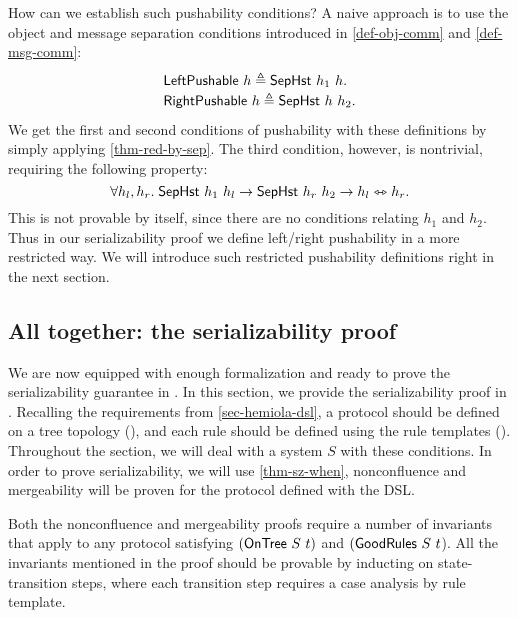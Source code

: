 How can we establish such pushability conditions?
A naive approach is to use the object and message separation conditions introduced in \autoref{def-obj-comm} and \autoref{def-msg-comm}:
\begin{displaymath}
  \renewcommand{\arraystretch}{1.2}
  \begin{array}{l}
    \mathsf{LeftPushable}\ h \triangleq \stseph{h_1}{h}.\\
    \mathsf{RightPushable}\ h \triangleq \stseph{h}{h_2}.
  \end{array}
\end{displaymath}
We get the first and second conditions of pushability with these definitions by simply applying \autoref{thm-red-by-sep}.
The third condition, however, is nontrivial, requiring the following property:
\begin{displaymath}
  \forall h_l, h_r.\; \mathsf{SepHst}\ h_1\ h_l \to \mathsf{SepHst}\ h_r\ h_2 \to h_l \leftrightarrowtriangle h_r.
\end{displaymath}
This is not provable by itself, since there are no conditions relating $h_1$ and $h_2$.
Thus in our serializability proof we define left/right pushability in a more restricted way.
We will introduce such restricted pushability definitions right in the next section.

\subsection{All together: the serializability proof}
\label{sec-sz-proof-all}

We are now equipped with enough formalization and ready to prove the serializability guarantee in \hemiola{}.
In this section, we provide the serializability proof in \hemiola{}.
Recalling the requirements from \autoref{sec-hemiola-dsl}, a protocol should be defined on a tree topology (), and each rule should be defined using the rule templates ().
Throughout the section, we will deal with a system $S$ with these conditions.
In order to prove serializability, we will use \autoref{thm-sz-when}, \ie{} nonconfluence and mergeability will be proven for the protocol defined with the \hemiola{} DSL.

Both the nonconfluence and mergeability proofs require a number of invariants that apply to any protocol satisfying $(\mathsf{OnTree}\ S\ t)$ and $(\mathsf{GoodRules}\ S\ t$).
All the invariants mentioned in the proof should be provable by inducting on state-transition steps, where each transition step requires a case analysis by rule template.

